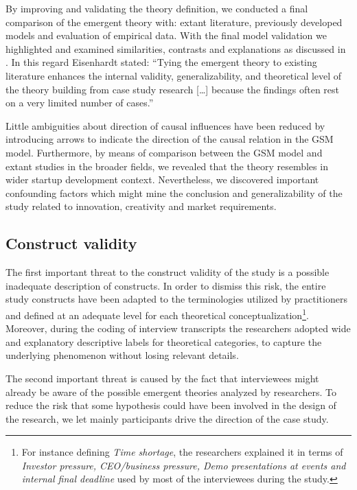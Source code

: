 \documentclass[10pt,journal,letterpaper,compsoc]{IEEEtran}
\begin{document}
By improving and validating the theory definition, we conducted a final 
comparison of the emergent theory with: extant literature, previously developed 
models and evaluation of empirical data. With the final model validation we 
highlighted and examined similarities, contrasts and explanations as discussed 
in \cite{Eisenhardt2007}.  In this regard Eisenhardt stated: ``Tying the 
emergent theory to existing literature enhances the internal validity, 
generalizability, and theoretical level of the theory building from case study 
research [\ldots] because the findings often rest on a very limited number of 
cases.''

Little ambiguities about direction of causal influences have been reduced by 
introducing arrows to indicate the direction of the causal relation in the GSM 
model. Furthermore, by means of comparison between the GSM model and extant 
studies in the broader fields, we revealed that the theory resembles in wider 
startup development context. Nevertheless, we discovered important confounding 
factors which might mine the conclusion and generalizability of the study 
related to innovation, creativity and market requirements.

\subsection{Construct validity}
The first important threat to the construct validity of the study is a 
possible inadequate description of constructs. In order to dismiss this risk, 
the entire study constructs have been adapted to the terminologies utilized by 
practitioners and defined at an adequate level for each theoretical 
conceptualization\footnote{For instance defining \textit{Time shortage}, the 
researchers explained it in terms of \textit{Investor pressure, CEO/business 
pressure, Demo presentations at events and internal final deadline} used by most 
of the interviewees during the study.}. Moreover, during the coding of interview 
transcripts the researchers adopted wide and explanatory descriptive labels for 
theoretical categories, to capture the underlying phenomenon without losing 
relevant details.

The second important threat is caused by the fact that interviewees might 
already be aware of the possible emergent theories analyzed by researchers. To 
reduce the risk that some hypothesis could have been involved in the design of 
the research, we let mainly participants drive the direction of the case study.
\end{document}
